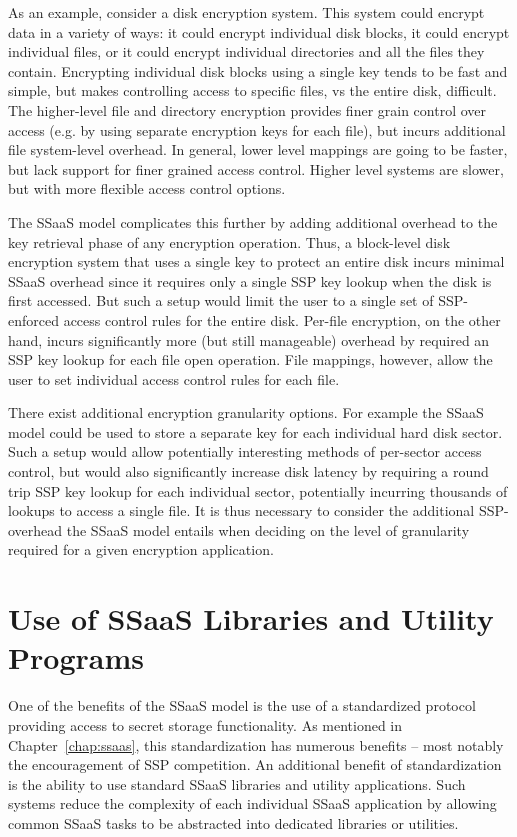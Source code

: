 As an example, consider a disk encryption system. This system could
encrypt data in a variety of ways: it could encrypt individual disk
blocks, it could encrypt individual files, or it could encrypt
individual directories and all the files they contain. Encrypting
individual disk blocks using a single key tends to be fast and simple,
but makes controlling access to specific files, vs the entire disk,
difficult. The higher-level file and directory encryption provides
finer grain control over access (e.g. by using separate encryption
keys for each file), but incurs additional file system-level
overhead. In general, lower level mappings are going to be faster, but
lack support for finer grained access control. Higher level systems
are slower, but with more flexible access control options.

The SSaaS model complicates this further by adding additional overhead
to the key retrieval phase of any encryption operation. Thus, a
block-level disk encryption system that uses a single key to protect
an entire disk incurs minimal SSaaS overhead since it requires only a
single SSP key lookup when the disk is first accessed. But such a
setup would limit the user to a single set of SSP-enforced access
control rules for the entire disk. Per-file encryption, on the other
hand, incurs significantly more (but still manageable) overhead by
required an SSP key lookup for each file open operation. File
mappings, however, allow the user to set individual access control
rules for each file.

There exist additional encryption granularity options. For example the
SSaaS model could be used to store a separate key for each individual
hard disk sector. Such a setup would allow potentially interesting
methods of per-sector access control, but would also significantly
increase disk latency by requiring a round trip SSP key lookup for
each individual sector, potentially incurring thousands of lookups to
access a single file. It is thus necessary to consider the additional
SSP-overhead the SSaaS model entails when deciding on the level of
granularity required for a given encryption application.

\section{Use of SSaaS Libraries and Utility Programs}

One of the benefits of the SSaaS model is the use of a standardized
protocol providing access to secret storage functionality. As
mentioned in Chapter~\ref{chap:ssaas}, this standardization has
numerous benefits -- most notably the encouragement of SSP
competition. An additional benefit of standardization is the ability
to use standard SSaaS libraries and utility applications. Such systems
reduce the complexity of each individual SSaaS application by
allowing common SSaaS tasks to be abstracted into dedicated libraries
or utilities.


